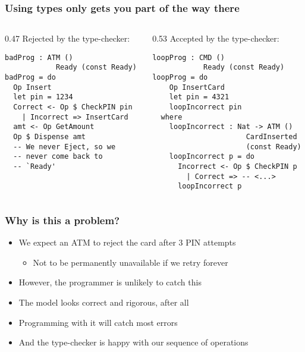 \documentclass[compress,handout]{beamer}
\begin{document}
\begin{frame}[fragile]
  \frametitle{Using types only gets you part of the way there}

  \begin{columns}
  \begin{column}{0.47\framewidth}
    {\color{red} Rejected by the type-checker:}
    \vspace*{1mm}
    \begin{verbatim}
badProg : ATM ()
            Ready (const Ready)
badProg = do
  Op Insert
  let pin = 1234
  Correct <- Op $ CheckPIN pin
    | Incorrect => InsertCard
  amt <- Op GetAmount
  Op $ Dispense amt 
  -- We never Eject, so we
  -- never come back to
  -- `Ready'
    \end{verbatim}
    \vspace*{2.5mm}
  \end{column}

  \pause  %

  \hspace*{-0.6mm}
  \vrule{}

  \begin{column}{0.53\framewidth}
    {\color{orange} Accepted by the type-checker:}
    \vspace*{1mm}
    \begin{verbatim}
loopProg : CMD ()
            Ready (const Ready)
loopProg = do
    Op InsertCard
    let pin = 4321
    loopIncorrect pin
  where
    loopIncorrect : Nat -> ATM ()
                      CardInserted
                      (const Ready)
    loopIncorrect p = do
      Incorrect <- Op $ CheckPIN p
        | Correct => -- <...>
      loopIncorrect p
    \end{verbatim}
    \vspace*{-6mm}
  \end{column}
  \end{columns}
\end{frame}


\begin{frame}
  \frametitle{Why is this a problem?}

  \begin{itemize}
    \item<1-> We expect an ATM to reject the card after 3 PIN attempts
    \begin{itemize}
      \item<1-> Not to be permanently unavailable if we retry forever
    \end{itemize}
    \item<2-> However, the programmer is unlikely to catch this
    \item<3-> The model looks correct and rigorous, after all
    \item<4-> Programming with it will catch most errors
    \item<5-> And the type-checker is happy with our sequence of operations
  \end{itemize}
\end{frame}
\end{document}
